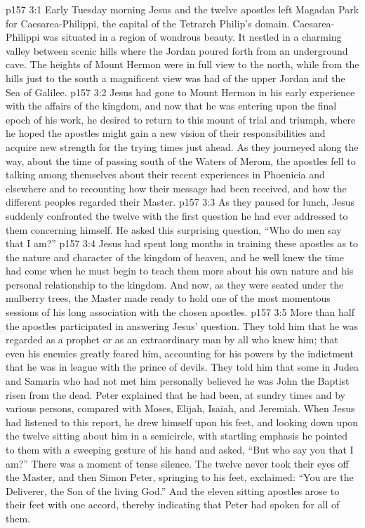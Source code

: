 \vs p157 3:1 Early Tuesday morning Jesus and the twelve apostles left Magadan Park for Caesarea\hyp{}Philippi, the capital of the Tetrarch Philip’s domain. Caesarea\hyp{}Philippi was situated in a region of wondrous beauty. It nestled in a charming valley between scenic hills where the Jordan poured forth from an underground cave. The heights of Mount Hermon were in full view to the north, while from the hills just to the south a magnificent view was had of the upper Jordan and the Sea of Galilee.
\vs p157 3:2 Jesus had gone to Mount Hermon in his early experience with the affairs of the kingdom, and now that he was entering upon the final epoch of his work, he desired to return to this mount of trial and triumph, where he hoped the apostles might gain a new vision of their responsibilities and acquire new strength for the trying times just ahead. As they journeyed along the way, about the time of passing south of the Waters of Merom, the apostles fell to talking among themselves about their recent experiences in Phoenicia and elsewhere and to recounting how their message had been received, and how the different peoples regarded their Master.
\vs p157 3:3 As they paused for lunch, Jesus suddenly confronted the twelve with the first question he had ever addressed to them concerning himself. He asked this surprising question, \textcolor{ubdarkred}{“Who do men say that I am?”}
\pc \vs p157 3:4 Jesus had spent long months in training these apostles as to the nature and character of the kingdom of heaven, and he well knew the time had come when he must begin to teach them more about his own nature and his personal relationship to the kingdom. And now, as they were seated under the mulberry trees, the Master made ready to hold one of the most momentous sessions of his long association with the chosen apostles.
\pc \vs p157 3:5 More than half the apostles participated in answering Jesus’ question. They told him that he was regarded as a prophet or as an extraordinary man by all who knew him; that even his enemies greatly feared him, accounting for his powers by the indictment that he was in league with the prince of devils. They told him that some in Judea and Samaria who had not met him personally believed he was John the Baptist risen from the dead. Peter explained that he had been, at sundry times and by various persons, compared with Moses, Elijah, Isaiah, and Jeremiah. When Jesus had listened to this report, he drew himself upon his feet, and looking down upon the twelve sitting about him in a semicircle, with startling emphasis he pointed to them with a sweeping gesture of his hand and asked, \textcolor{ubdarkred}{“But who say you that I am?”} There was a moment of tense silence. The twelve never took their eyes off the Master, and then Simon Peter, springing to his feet, exclaimed: “You are the Deliverer, the Son of the living God.” And the eleven sitting apostles arose to their feet with one accord, thereby indicating that Peter had spoken for all of them.
